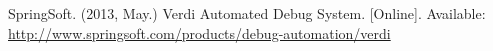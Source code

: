 \begin{thebibliography}{10}
\BIBentryALTinterwordspacing
SpringSoft. (2013, May.) {Verdi Automated Debug System}. [Online]. Available:
  \url{http://www.springsoft.com/products/debug-automation/verdi}
\BIBentrySTDinterwordspacing

%
%
%
%
%
%
%

\end{thebibliography}

